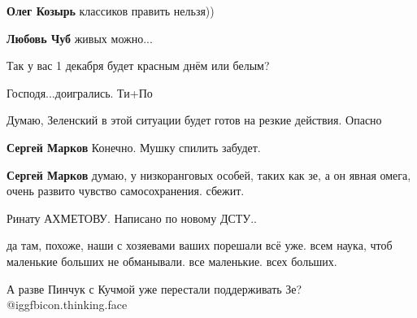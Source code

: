 \begin{itemize}
\begin{itemize}
\textbf{Олег Козырь} классиков править нельзя))

\textbf{Любовь Чуб} живых можно...
\end{itemize} %

Так у вас 1 декабря будет красным днём или белым?

Господя...доигрались. Ти+По


Думаю, Зеленский в этой ситуации будет готов на резкие действия. Опасно

\begin{itemize} %
\textbf{Сергей Марков} Конечно. Мушку спилить забудет.

\textbf{Сергей Марков} думаю, у низкоранговых особей, таких как зе, а он явная омега, очень развито чувство самосохранения.
сбежит.
\end{itemize} %

Ринату АХМЕТОВУ. Написано по новому ДСТУ..

да там, похоже, наши с хозяевами ваших порешали всё уже.
всем наука, чтоб маленькие больших не обманывали.
все маленькие. всех больших.

А разве Пинчук с Кучмой уже перестали поддерживать Зе? @igg{fbicon.thinking.face} 

\end{itemize} %

